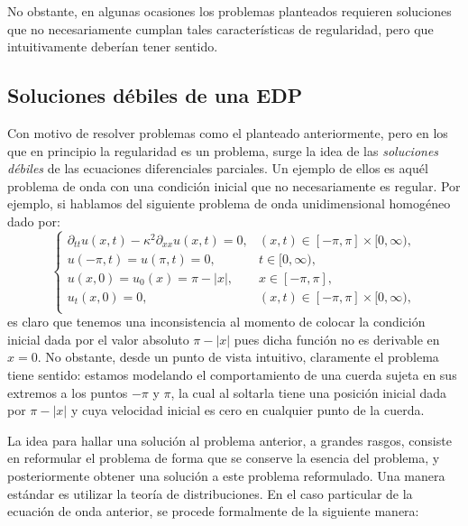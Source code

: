 \documentclass[letterpaper,twoside,12pt]{book}
\newcommand{\1}{\mathds{1}}
\newcommand{\abs}[1]{\left\lvert #1 \right\rvert}
\theoremstyle{definition}
\theoremstyle{definition}
\theoremstyle{remark}
\theoremstyle{definition}
\theoremstyle{definition}
\theoremstyle{definition}
\theoremstyle{definition}
\theoremstyle{definition}
\begin{document}
No obstante, en algunas ocasiones los problemas planteados requieren soluciones que no necesariamente cumplan tales características de regularidad, pero que intuitivamente deberían tener sentido.

\subsection{Soluciones débiles de una EDP}

Con motivo de resolver problemas como el planteado anteriormente, pero en los que en principio la regularidad es un problema, surge la idea de las \textit{soluciones débiles} de las ecuaciones diferenciales parciales. Un ejemplo de ellos es aquél problema de onda con una condición inicial que no necesariamente es regular. Por ejemplo, si hablamos del siguiente problema de onda unidimensional homogéneo dado por:
\begin{equation}\label{wave_eq_sobolev}
    \begin{cases}
        \partial_{tt}u(x,t)-\kappa^2\partial_{xx}u(x,t)=0, & (x,t)\in [-\pi,\pi]\times[0,\infty),\\
        u(-\pi,t)=u(\pi,t)=0, & t\in [0,\infty),\\
        u(x,0)=u_0(x)=\pi-\abs{x}, & x\in [-\pi,\pi],\\
        u_t(x,0)=0, & (x,t) \in [-\pi,\pi]\times[0,\infty),\\
    \end{cases}
\end{equation}
es claro que tenemos una inconsistencia al momento de colocar la condición inicial dada por el valor absoluto $\pi-|x|$ pues dicha función no es derivable en $x=0$. No obstante, desde un punto de vista intuitivo, claramente el problema tiene sentido: estamos modelando el comportamiento de una cuerda sujeta en sus extremos a los puntos $-\pi$ y $\pi$, la cual al soltarla tiene una posición inicial dada por $\pi-|x|$ y cuya velocidad inicial es cero en cualquier punto de la cuerda.

La idea para hallar una solución al problema anterior, a grandes rasgos, consiste en reformular el problema de forma que se conserve la esencia del problema, y posteriormente obtener una solución a este problema reformulado. Una manera estándar es utilizar la teoría de distribuciones. En el caso particular de la ecuación de onda anterior, se procede formalmente de la siguiente manera:
\end{document}
